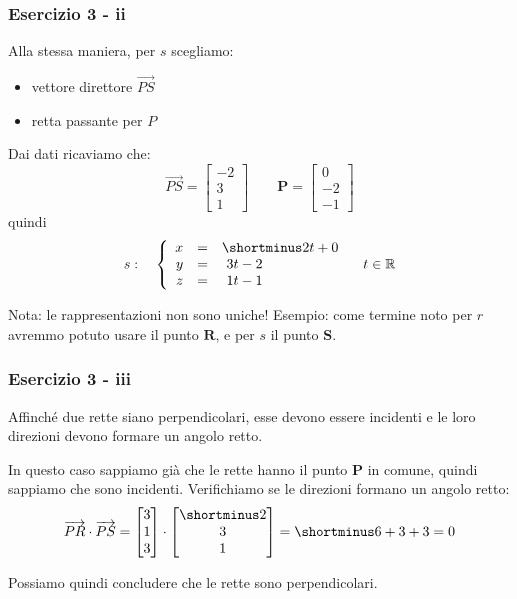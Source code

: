 \documentclass{beamer}
\begin{document}
\begin{frame}
\frametitle{Esercizio 3 - ii}

Alla stessa maniera, per $s$ scegliamo:
\begin{itemize}
        \item vettore direttore $\overrightarrow{PS}$
        \item retta passante per $P$
\end{itemize}
Dai dati ricaviamo che:
$$
\overrightarrow{PS} = \left[
\begin{array}{c}
-2\\
3\\
1
\end{array}
\right]
\qquad
\mathbf P = \left[
\begin{array}{c}
0\\
-2\\
-1
\end{array}
\right]
$$
quindi 
$$s: \quad \left\{
\begin{array}{rcl}
x&=&\shortminus 2t+0\\
y&=&\ 3t-2\\
z&=&\ 1t-1
\end{array}
\right. \quad t\in \mathbb{R}
$$

Nota: le rappresentazioni non sono uniche! Esempio: come termine noto
per $r$ avremmo potuto usare il punto $\mathbf R$, e per $s$ il punto $\mathbf S$.
\end{frame}

\begin{frame}
\frametitle{Esercizio 3 - iii}
Affinch\'e due rette siano perpendicolari, esse devono essere incidenti e le loro direzioni
devono formare un angolo retto.

    \vspace{0.4cm}
In questo caso sappiamo gi\`a che le rette hanno il punto $\mathbf P$ in comune, quindi sappiamo
che sono incidenti. Verifichiamo se le direzioni formano un angolo retto:
\begin{displaymath}
\overrightarrow{PR} \cdot \overrightarrow{PS}
    =
\begin{bmatrix} 3 \\ 1 \\3 \end{bmatrix}\cdot \begin{bmatrix}\shortminus 2\\ 3 \\1 \end{bmatrix} =
    \shortminus 6 + 3 + 3 = 0
\end{displaymath}

Possiamo quindi concludere che le rette sono perpendicolari.
\end{frame}
\end{document}
